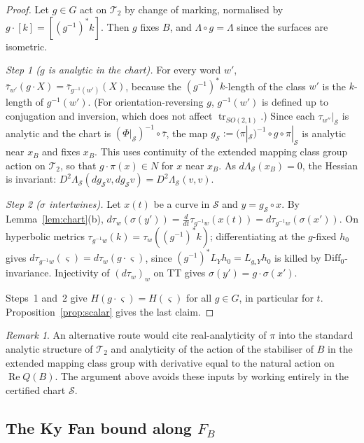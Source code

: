 \documentclass[11pt]{amsart}
\theoremstyle{definition}
\theoremstyle{remark}
\newtheorem{remark}[theorem]{Remark}
\newcommand{\Teich}{\mathcal{T}_2}
\newcommand{\Sl}{\mathcal{S}}
\newcommand{\tr}{\operatorname{tr}}
\newcommand{\xB}{x_B}
\newcommand{\FB}{F_B}
\begin{document}
\begin{proof}
Let $g\in G$ act on $\Teich$ by change of marking, normalised by $g\cdot[k]=[(g^{-1})^*k]$. Then $g$
fixes $B$, and $\Lambda\circ g=\Lambda$ since the surfaces are isometric.

\emph{Step 1 ($g$ is analytic in the chart).} For every word $w'$,
$\bar\tau_{w'}(g\cdot X)=\bar\tau_{g^{-1}(w')}(X)$, because the $(g^{-1})^*k$-length of the class $w'$ is
the $k$-length of $g^{-1}(w')$. (For orientation-reversing $g$, $g^{-1}(w')$ is defined up to
conjugation and inversion, which does not affect $\tr_{SO(2,1)}$.) Since each $\tau_{w''}|_\Sl$ is
analytic and the chart is $(\Phi|_\Sl)^{-1}\circ\bar\tau$, the map $g_\Sl:=(\pi|_\Sl)^{-1}\circ g\circ\pi|_\Sl$ is
analytic near $\xB$ and fixes $\xB$. This uses continuity of the extended mapping class group
action on $\Teich$, so that $g\cdot\pi(x)\in N$ for $x$ near $\xB$. As $d\Lambda_\Sl(\xB)=0$, the Hessian is
invariant: $D^2\Lambda_\Sl(dg_\Sl v,dg_\Sl v)=D^2\Lambda_\Sl(v,v)$.

\emph{Step 2 ($\sigma$ intertwines).} Let $x(t)$ be a curve in $\Sl$ and $y=g_\Sl\circ x$. By
Lemma~\ref{lem:chart}(b), $d\tau_w(\sigma(y'))=\frac{d}{dt}\tau_{g^{-1}w}(x(t))=d\tau_{g^{-1}w}(\sigma(x'))$. On
hyperbolic metrics $\tau_{g^{-1}w}(k)=\tau_w((g^{-1})^*k)$; differentiating at the $g$-fixed $h_0$ gives
$d\tau_{g^{-1}w}(\varsigma)=d\tau_w(g\cdot\varsigma)$, since $(g^{-1})^*L_Yh_0=L_{g_*Y}h_0$ is killed by
$\mathrm{Diff}_0$-invariance. Injectivity of $(d\tau_w)_w$ on TT gives $\sigma(y')=g\cdot\sigma(x')$.

Steps~1 and~2 give $H(g\cdot\varsigma)=H(\varsigma)$ for all $g\in G$, in particular for $t$.
Proposition~\ref{prop:scalar} gives the last claim.
\end{proof}

\begin{remark}
An alternative route would cite real-analyticity of $\pi$ into the standard analytic structure of
$\Teich$ and analyticity of the action of the stabiliser of $B$ in the extended mapping class
group with derivative equal to the natural action on $\operatorname{Re}Q(B)$. The argument above
avoids these inputs by working entirely in the certified chart $\Sl$.
\end{remark}

\subsection{The Ky Fan bound along $\FB$}
\end{document}
